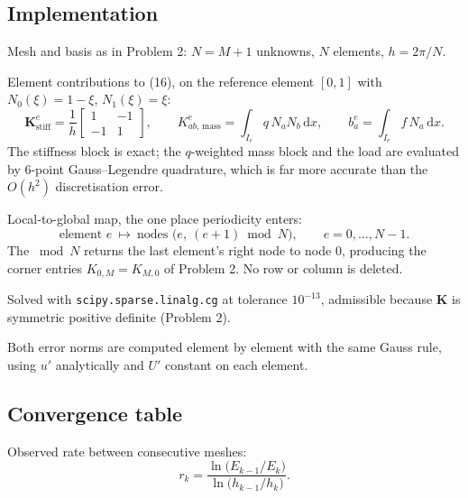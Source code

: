 \documentclass[11pt]{article}
\newcommand{\dx}{\,\mathrm{d}x}
\newcommand{\Kmat}{\bm{K}}
\begin{document}
\subsection*{Implementation }

\begin{steps}
\item Mesh and basis as in Problem 2: $N=M+1$ unknowns, $N$ elements, $h=2\pi/N$.
\item Element contributions to (16), on the reference element $[0,1]$
      with $N_0(\xi)=1-\xi$, $N_1(\xi)=\xi$:
\begin{equation}\label{eq:p5elem}
  \bm{K}^{e}_{\text{stiff}}=\frac{1}{h}\begin{bmatrix}1&-1\\-1&1\end{bmatrix},
  \qquad
  K^{e}_{ab,\,\text{mass}}=\int_{I_e}q\,N_aN_b\dx ,
  \qquad
  b^{e}_{a}=\int_{I_e}f\,N_a\dx .
\end{equation}
      The stiffness block is exact; the $q$-weighted mass block and the load are
      evaluated by $6$-point Gauss--Legendre quadrature, which is far more
      accurate than the $O(h^{2})$ discretisation error.
\item Local-to-global map, the one place periodicity enters:
\begin{equation}\label{eq:p5wrap}
  \text{element }e\ \longmapsto\ \text{nodes }\bigl(e,\ (e+1)\bmod N\bigr),
  \qquad e=0,\dots,N-1 .
\end{equation}
      The $\bmod N$ returns the last element's right node to node $0$, producing
      the corner entries $K_{0,M}=K_{M,0}$ of Problem 2. No row or column is
      deleted.
\item Solved with \texttt{scipy.sparse.linalg.cg} at tolerance $10^{-13}$,
      admissible because $\Kmat$ is symmetric positive definite (Problem 2).
\item Both error norms are computed element by element with the same Gauss rule,
      using $u'$ analytically and $U'$ constant on each element.
\end{steps}

\subsection*{Convergence table}

Observed rate between consecutive meshes:
\begin{equation}\label{eq:p5rate}
  r_k=\frac{\ln\bigl(E_{k-1}/E_k\bigr)}{\ln\bigl(h_{k-1}/h_k\bigr)} .
\end{equation}
\end{document}
